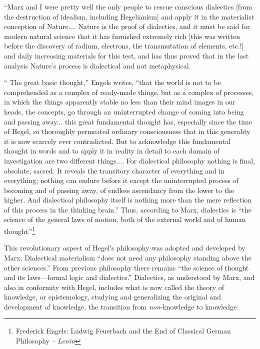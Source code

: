 \documentclass[a4paper,12pt]{book}
\begin{document}
“Marx and I were pretty well the only people to rescue conscious dialectics [from the destruction of idealism, including Hegelianism] and apply it in the materialist conception of Nature.... Nature is the proof of dialectics, and it must be said for modern natural science that it has furnished extremely rich [this was written before the discovery of radium, electrons, the transmutation of elements, etc.!] and daily increasing materials for this test, and has thus proved that in the last analysis Nature’s process is dialectical and not metaphysical.

“ The great basic thought,” Engels writes, “that the world is not to be comprehended as a complex of ready-made things, but as a complex of processes, in which the things apparently stable no less than their mind images in our heads, the concepts, go through an uninterrupted change of coming into being and passing away... this great fundamental thought has, especially since the time of Hegel, so thoroughly permeated ordinary consciousness that in this generality it is now scarcely ever contradicted. But to acknowledge this fundamental thought in words and to apply it in reality in detail to each domain of investigation are two different things.... For dialectical philosophy nothing is final, absolute, sacred. It reveals the transitory character of everything and in everything; nothing can endure before it except the uninterrupted process of becoming and of passing away, of endless ascendancy from the lower to the higher. And dialectical philosophy itself is nothing more than the mere reflection of this process in the thinking brain.” Thus, according to Marx, dialectics is “the science of the general laws of motion, both of the external world and of human thought.”\footnote{Frederick Engels: Ludwig Feuerbach and the End of Classical German Philosophy -- \emph{Lenin}}

This revolutionary aspect of Hegel’s philosophy was adopted and developed by Marx. Dialectical materialism “does not need any philosophy standing above the other sciences.” From previous philosophy there remains “the science of thought and its laws—formal logic and dialectics.” Dialectics, as understood by Marx, and also in conformity with Hegel, includes what is now called the theory of knowledge, or epistemology, studying and generalizing the original and development of knowledge, the transition from \emph{non}-knowledge to knowledge.
\end{document}
